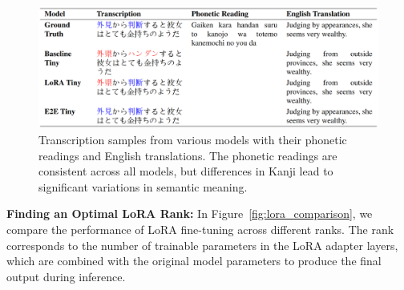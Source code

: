\documentclass[10pt,twocolumn,letterpaper]{article}
\begin{document}
        
        

\begin{figure}[ht]
    \centering
    \includegraphics[width=0.95\linewidth]{./qual_table.png}
    \caption{Transcription samples from various models with their phonetic readings and English translations. The phonetic readings are consistent across all models, but differences in Kanji lead to significant variations in semantic meaning.}
    \label{tab:transcription_comparison}
\end{figure}

\textbf{Finding an Optimal LoRA Rank:}
In Figure~\ref{fig:lora_comparison}, we compare the performance of LoRA fine-tuning across different ranks. The rank corresponds to the number of trainable parameters in the LoRA adapter layers, which are combined with the original model parameters to produce the final output during inference.
\end{document}
